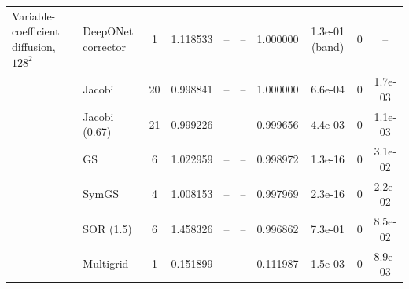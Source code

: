 {\begin{tabular}{llcccccccc}
Variable-coefficient diffusion, $128^2$ & DeepONet corrector & 1 & 1.118533 & -- & -- & 1.000000 & 1.3e-01 (band) & 0 & -- \\
 & Jacobi & 20 & 0.998841 & -- & -- & 1.000000 & 6.6e-04 & 0 & 1.7e-03 \\
 & Jacobi (0.67) & 21 & 0.999226 & -- & -- & 0.999656 & 4.4e-03 & 0 & 1.1e-03 \\
 & GS & 6 & 1.022959 & -- & -- & 0.998972 & 1.3e-16 & 0 & 3.1e-02 \\
 & SymGS & 4 & 1.008153 & -- & -- & 0.997969 & 2.3e-16 & 0 & 2.2e-02 \\
 & SOR (1.5) & 6 & 1.458326 & -- & -- & 0.996862 & 7.3e-01 & 0 & 8.5e-02 \\
 & Multigrid & 1 & 0.151899 & -- & -- & 0.111987 & 1.5e-03 & 0 & 8.9e-03 \\
\bottomrule
\end{tabular}}
